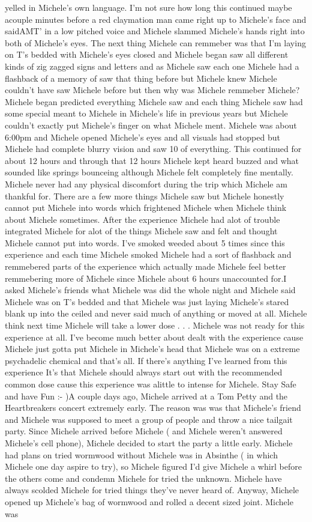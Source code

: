 \documentclass[12pt]{book}
\begin{document}
yelled in Michele's own language. I'm not sure how long this continued maybe acouple minutes before a red claymation man came right up to Michele's face and saidAMT' in a low pitched voice and Michele slammed Michele's hands right into both of Michele's eyes. The next thing Michele can remmeber was that I'm laying on T's bedded with Michele's eyes closed and Michele began saw all different kinds of zig zagged signs and letters and as Michele saw each one Michele had a flashback of a memory of saw that thing before but Michele knew Michele couldn't have saw Michele before but then why was Michele remmeber Michele? Michele began predicted everything Michele saw and each thing Michele saw had some special meant to Michele in Michele's life in previous years but Michele couldn't exactly put Michele's finger on what Michele ment. Michele was about 6:00pm and Michele opened Michele's eyes and all visuals had stopped but Michele had complete blurry vision and saw 10 of everything. This continued for about 12 hours and through that 12 hours Michele kept heard buzzed and what sounded like springs bounceing although Michele felt completely fine mentally. Michele never had any physical discomfort during the trip which Michele am thankful for. There are a few more things Michele saw but Michele honestly cannot put Michele into words which frightened Michele when Michele think about Michele sometimes. After the experience Michele had alot of trouble integrated Michele for alot of the things Michele saw and felt and thought Michele cannot put into words. I've smoked weeded about 5 times since this experience and each time Michele smoked Michele had a sort of flashback and remmebered parts of the experience which actually made Michele feel better remmebering more of Michele since Michele about 6 hours unaccounted for.I asked Michele's friends what Michele was did the whole night and Michele said Michele was on T's bedded and that Michele was just laying Michele's stared blank up into the ceiled and never said much of anything or moved at all. Michele think next time Michele will take a lower dose . . .  Michele was not ready for this experience at all. I've become much better about dealt with the experience cause Michele just gotta put Michele in Michele's head that Michele was on a extreme psychadelic chemical and that's all. If there's anything I've learned from this experience It's that Michele should always start out with the recommended common dose cause this experience was alittle to intense for Michele. Stay Safe and have Fun :- )A couple days ago, Michele arrived at a Tom Petty and the Heartbreakers concert extremely early. The reason was was that Michele's friend and Michele was supposed to meet a group of people and throw a nice tailgait party. Since Michele arrived before Michele ( and Michele weren't answered Michele's cell phone), Michele decided to start the party a little early. Michele had plans on tried wormwood without Michele was in Absinthe ( in which Michele one day aspire to try), so Michele figured I'd give Michele a whirl before the others come and condemn Michele for tried the unknown. Michele have always scolded Michele for tried things they've never heard of. Anyway, Michele opened up Michele's bag of wormwood and rolled a decent sized joint. Michele was 
\end{document}
